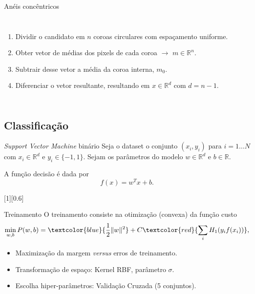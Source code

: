 	\begin{frame}{Anéis concêntricos}
		\begin{columns}
		\begin{enumerate}
			\item Dividir o candidato em $n$ coroas circulares com espaçamento uniforme.
			\item Obter vetor de médias dos pixels de cada coroa $\rightarrow$ $m \in \mathbb{R}^n$. 
			\item Subtrair desse vetor a média da coroa interna, $m_0$.
			\item Diferenciar o vetor resultante, resultando em $x \in \mathbb{R}^d$  com $d=n-1$.
		\end{enumerate}
		\end{columns}
	\end{frame}

\subsection{Classificação}
	\begin{frame}{\textit{Support Vector Machine} binário}
		Seja o dataset o conjunto $(x_i, y_i)$ para $i=1 \dots N$ com $x_i \in \mathbb{R}^d$ e $y_i \in \{-1, 1\}$. Sejam os parâmetros do modelo $w \in \mathbb{R}^d$ e $b \in \mathbb{R}$.

		A função decisão é dada por
		\begin{equation*}
		f(x)=w^T x+ b.
		\end{equation*}

		[1][0.6]
	\end{frame}

	\begin{frame}{Treinamento}
		O treinamento consiste na otimização (convexa) da função custo
		\begin{equation*}
			\label{eq:svm-cost}
			\min_{w,b} P(w,b) = \textcolor{blue}{\frac{1}{2}\|w\|^2} + C\textcolor{red}{\sum_i H_1(y_i f(x_i))},
		\end{equation*}

		\begin{itemize}
			\item<1-> Maximização da margem \emph{versus} erros de treinamento.
			\item<2-> Transformação de espaço: Kernel RBF, parâmetro $\sigma$.
			\item<3-> Escolha hiper-parâmetros: Validação Cruzada (5 conjuntos).
		\end{itemize}

	\end{frame}
